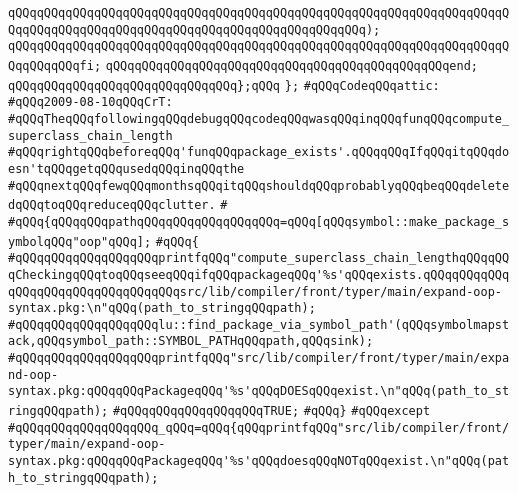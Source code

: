 \verb|qQQqqQQqqQQqqQQqqQQqqQQqqQQqqQQqqQQqqQQqqQQqqQQqqQQqqQQqqQQqqQQqqQQqqQQqqQQqqQQqqQQqqQQqqQQqqQQqqQQqqQQqqQQqqQQqqQQqqQQq);|\newline
\verb|qQQqqQQqqQQqqQQqqQQqqQQqqQQqqQQqqQQqqQQqqQQqqQQqqQQqqQQqqQQqqQQqqQQqqQQqqQQqqQQqfi;|\newline
\verb|qQQqqQQqqQQqqQQqqQQqqQQqqQQqqQQqqQQqqQQqqQQqqQQqend;|\newline
\verb|qQQqqQQqqQQqqQQqqQQqqQQqqQQqqQQq};qQQq|\newline
\newline
\verb|};|\newline
\newline
\newline
\newline
\verb|#qQQqCodeqQQqattic:|\newline
\verb|#qQQq2009-08-10qQQqCrT:|\newline
\verb|#qQQqTheqQQqfollowingqQQqdebugqQQqcodeqQQqwasqQQqinqQQqfunqQQqcompute_superclass_chain_length|\newline
\verb|#qQQqrightqQQqbeforeqQQq'funqQQqpackage_exists'.qQQqqQQqIfqQQqitqQQqdoesn'tqQQqgetqQQqusedqQQqinqQQqthe|\newline
\verb|#qQQqnextqQQqfewqQQqmonthsqQQqitqQQqshouldqQQqprobablyqQQqbeqQQqdeletedqQQqtoqQQqreduceqQQqclutter.|\newline
\verb|#|\newline
\verb|#qQQq{qQQqqQQqpathqQQqqQQqqQQqqQQqqQQq=qQQq[qQQqsymbol::make_package_symbolqQQq"oop"qQQq];|\newline
\verb|#qQQq{|\newline
\verb|#qQQqqQQqqQQqqQQqqQQqprintfqQQq"compute_superclass_chain_lengthqQQqqQQqCheckingqQQqtoqQQqseeqQQqifqQQqpackageqQQq'%s'qQQqexists.qQQqqQQqqQQqqQQqqQQqqQQqqQQqqQQqqQQqsrc/lib/compiler/front/typer/main/expand-oop-syntax.pkg:\n"qQQq(path_to_stringqQQqpath);|\newline
\verb|#qQQqqQQqqQQqqQQqqQQqlu::find_package_via_symbol_path'(qQQqsymbolmapstack,qQQqsymbol_path::SYMBOL_PATHqQQqpath,qQQqsink);|\newline
\verb|#qQQqqQQqqQQqqQQqqQQqprintfqQQq"src/lib/compiler/front/typer/main/expand-oop-syntax.pkg:qQQqqQQqPackageqQQq'%s'qQQqDOESqQQqexist.\n"qQQq(path_to_stringqQQqpath);|\newline
\verb|#qQQqqQQqqQQqqQQqqQQqTRUE;|\newline
\verb|#qQQq}|\newline
\verb|#qQQqexcept|\newline
\verb|#qQQqqQQqqQQqqQQqqQQq_qQQq=qQQq{qQQqprintfqQQq"src/lib/compiler/front/typer/main/expand-oop-syntax.pkg:qQQqqQQqPackageqQQq'%s'qQQqdoesqQQqNOTqQQqexist.\n"qQQq(path_to_stringqQQqpath);|\newline
